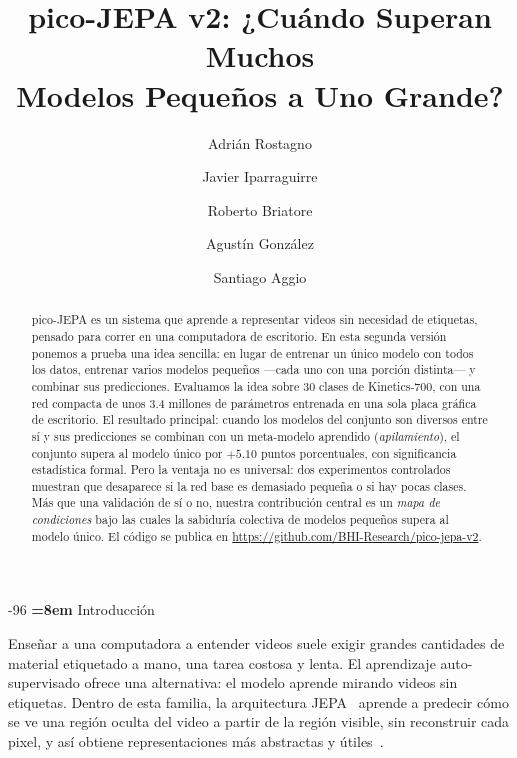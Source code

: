 \documentclass[runningheads]{llncs}
\title{pico-JEPA v2: ¿Cuándo Superan Muchos\\
Modelos Pequeños a Uno Grande?}
\author{Adrián Rostagno \and Javier Iparraguirre \and Roberto Briatore \and
Agustín González \and Santiago Aggio}
\institute{Universidad Tecnológica Nacional, Facultad Regional Bahía Blanca,
Bahía Blanca, Argentina\\
\email{\{arostag, jiparraguirre, rbriatore, agonzalez, slaggio\}@frbb.utn.edu.ar}}
\makeatletter
\renewcommand\section{\@startsection{section}{1}{\z@}%
   {-9\p@ \@plus -2\p@ \@minus -2\p@}{6\p@ \@plus 2\p@ \@minus 2\p@}%
   {\normalfont\large\bfseries\boldmath\rightskip=\z@ \@plus 8em\pretolerance=10000 }}
\makeatother
\begin{document}
\maketitle

\begin{abstract}
pico-JEPA es un sistema que aprende a representar videos sin necesidad de
etiquetas, pensado para correr en una computadora de escritorio. En esta segunda
versión ponemos a prueba una idea sencilla: en lugar de entrenar un único modelo
con todos los datos, entrenar varios modelos pequeños ---cada uno con una porción
distinta--- y combinar sus predicciones. Evaluamos la idea sobre 30 clases de
Kinetics-700, con una red compacta de unos 3.4 millones de parámetros entrenada
en una sola placa gráfica de escritorio. El resultado principal: cuando los
modelos del conjunto son diversos entre sí y sus predicciones se combinan con un
meta-modelo aprendido (\emph{apilamiento}), el conjunto supera al modelo único
por $+5.10$ puntos porcentuales, con significancia estadística formal. Pero la
ventaja no es universal: dos experimentos controlados muestran que desaparece si
la red base es demasiado pequeña o si hay pocas clases. Más que una validación de
sí o no, nuestra contribución central es un \emph{mapa de condiciones} bajo las
cuales la sabiduría colectiva de modelos pequeños supera al modelo único. El
código se publica en \url{https://github.com/BHI-Research/pico-jepa-v2}.

\end{abstract}

\section{Introducción}

Enseñar a una computadora a entender videos suele exigir grandes cantidades de
material etiquetado a mano, una tarea costosa y lenta. El aprendizaje
auto-supervisado ofrece una alternativa: el modelo aprende mirando videos sin
etiquetas. Dentro de esta familia, la arquitectura JEPA~\cite{lecun2022path}
aprende a predecir cómo se ve una región oculta del video a partir de la región
visible, sin reconstruir cada pixel, y así obtiene representaciones más
abstractas y útiles~\cite{assran2023self}.
\end{document}
